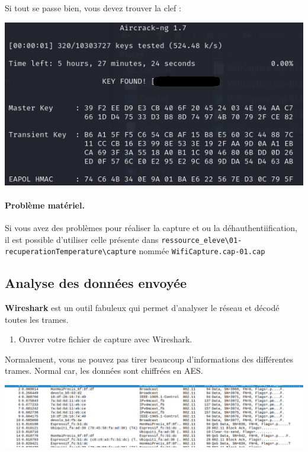 \documentclass[french, 12pt]{article}%
\begin{document}
Si tout se passe bien, vous devez trouver la clef : 
\begin{center}
\includegraphics[scale=0.7]{./ressource/clefTrouvee}
\end{center}

\paragraph{Problème matériel.} Si vous avez des problèmes pour réaliser la capture et ou la déhauthentiification, il est possible d'utiliser celle présente dans \verb?ressource_eleve\01-recuperationTemperature\capture? nommée \verb?WifiCapture.cap-01.cap?

\subsection{Analyse des données envoyée}

\textbf{Wireshark} est un outil fabuleux qui permet d'analyser le réseau et décodé toutes les trames.

\begin{enumerate}[resume]
\item Ouvrer votre fichier de capture avec Wireshark. 
\end{enumerate}

Normalement, vous ne pouvez pas tirer beaucoup d'informations des différentes trames. Normal car, les données sont chiffrées en AES. 

\begin{center}
\includegraphics[scale=0.4]{./ressource/capBrute}
\end{center}
\end{document}
